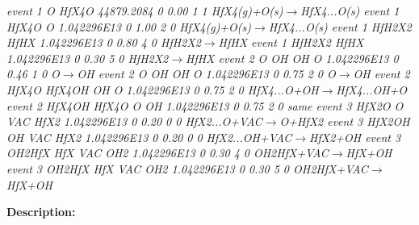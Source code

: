 \documentclass[a4paper,12pt]{report}
\begin{document}
{\footnotesize{\emph{event   1       O               HfX4O            44879.2084             0       0.00    1       1       HfX4(g)+O(s)$\to$HfX4...O(s)
\newline
event   1       HfX4O           O               1.042296E13             0       1.00    2       0       HfX4(g)+O(s)$\to$HfX4...O(s)
\newline
event   1       HfH2X2          HfHX            1.042296E13             0       0.80    4       0       HfH2X2$\to$HfHX
\newline
event   1       HfH2X2          HfHX            1.042296E13             0       0.30    5       0       HfH2X2$\to$HfHX
\newline
event   2       O               OH              OH              O               1.042296E13             0       0.46    1       0       O$\to$OH
\newline
event   2       O               OH              OH              O               1.042296E13             0       0.75    2       0       O$\to$OH
\newline
event   2       HfX4O           HfX4OH          OH              O               1.042296E13             0       0.75    2       0       HfX4...O+OH$\to$HfX4...OH+O
\newline
event   2       HfX4OH          HfX4O           O               OH              1.042296E13             0       0.75    2       0               same
\newline
event   3       HfX2O           O               VAC             HfX2            1.042296E13             0       0.20    0       0       HfX2...O+VAC$\to$O+HfX2
\newline
event   3       HfX2OH          OH              VAC             HfX2            1.042296E13             0       0.20    0       0       HfX2...OH+VAC$\to$HfX2+OH
\newline
event   3       OH2HfX          HfX             VAC             OH2             1.042296E13             0       0.30    4       0       OH2HfX+VAC$\to$HfX+OH
\newline
event   3       OH2HfX          HfX             VAC             OH2             1.042296E13             0       0.30    5       0       OH2HfX+VAC$\to$HfX+OH
\newline}}}


\textbf{Description:}
\newline
\end{document}

